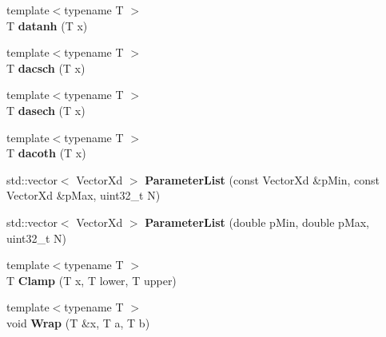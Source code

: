 \begin{DoxyCompactItemize}
\item 
\hypertarget{namespace_d_r_d_s_p_ae69d0af626f4617d940d1228c7bfa676}{{\footnotesize template$<$typename T $>$ }\\T {\bfseries datanh} (T x)}\label{namespace_d_r_d_s_p_ae69d0af626f4617d940d1228c7bfa676}

\item 
\hypertarget{namespace_d_r_d_s_p_a26f1292b057d381074af05089027acaa}{{\footnotesize template$<$typename T $>$ }\\T {\bfseries dacsch} (T x)}\label{namespace_d_r_d_s_p_a26f1292b057d381074af05089027acaa}

\item 
\hypertarget{namespace_d_r_d_s_p_a2084620a797bbe2cabda1b37069ddbb5}{{\footnotesize template$<$typename T $>$ }\\T {\bfseries dasech} (T x)}\label{namespace_d_r_d_s_p_a2084620a797bbe2cabda1b37069ddbb5}

\item 
\hypertarget{namespace_d_r_d_s_p_ac138ca785bb116c23f06d3666cf143d2}{{\footnotesize template$<$typename T $>$ }\\T {\bfseries dacoth} (T x)}\label{namespace_d_r_d_s_p_ac138ca785bb116c23f06d3666cf143d2}

\item 
\hypertarget{namespace_d_r_d_s_p_a49ed0c8501bbbcbe18585d160d2c22d1}{std\-::vector$<$ Vector\-Xd $>$ {\bfseries Parameter\-List} (const Vector\-Xd \&p\-Min, const Vector\-Xd \&p\-Max, uint32\-\_\-t N)}\label{namespace_d_r_d_s_p_a49ed0c8501bbbcbe18585d160d2c22d1}

\item 
\hypertarget{namespace_d_r_d_s_p_a32c1a9bd002d98aab0fc8818f9dc976e}{std\-::vector$<$ Vector\-Xd $>$ {\bfseries Parameter\-List} (double p\-Min, double p\-Max, uint32\-\_\-t N)}\label{namespace_d_r_d_s_p_a32c1a9bd002d98aab0fc8818f9dc976e}

\item 
\hypertarget{namespace_d_r_d_s_p_a2d0b3c508a2a29b8543ddd55d3d55a0c}{{\footnotesize template$<$typename T $>$ }\\T {\bfseries Clamp} (T x, T lower, T upper)}\label{namespace_d_r_d_s_p_a2d0b3c508a2a29b8543ddd55d3d55a0c}

\item 
\hypertarget{namespace_d_r_d_s_p_abfcccc8537d8c84ec19951dbd6ce22e3}{{\footnotesize template$<$typename T $>$ }\\void {\bfseries Wrap} (T \&x, T a, T b)}\label{namespace_d_r_d_s_p_abfcccc8537d8c84ec19951dbd6ce22e3}


\end{DoxyCompactItemize}
